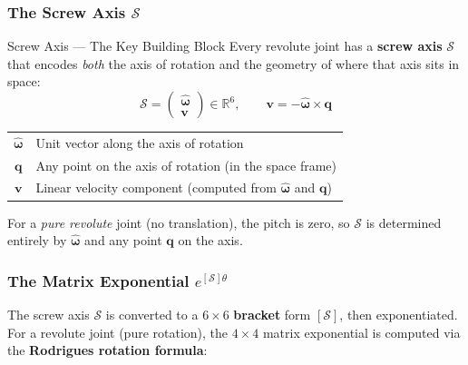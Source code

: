 \documentclass[12pt,a4paper]{article}
\newcommand{\R}{\mathbb{R}}
\newcommand{\vect}[1]{\bm{#1}}
\begin{document}
\subsubsection{The Screw Axis $\mathcal{S}$}

\begin{conceptbox}{Screw Axis --- The Key Building Block}
Every revolute joint has a \textbf{screw axis} $\mathcal{S}$ that
encodes \emph{both} the axis of rotation and the geometry of where that
axis sits in space:
\[
  \mathcal{S} = \begin{pmatrix}\vect{\hat\omega} \\ \vect{v}\end{pmatrix}
  \in \R^6,
  \qquad
  \vect{v} = -\vect{\hat\omega} \times \vect{q}
\]

\begin{tabular}{cl}
  $\vect{\hat\omega}$ & Unit vector along the axis of rotation \\
  $\vect{q}$          & Any point on the axis of rotation (in the space frame) \\
  $\vect{v}$          & Linear velocity component (computed from $\vect{\hat\omega}$ and $\vect{q}$) \\
\end{tabular}

For a \emph{pure revolute} joint (no translation), the pitch is zero, so
$\mathcal{S}$ is determined entirely by $\vect{\hat\omega}$ and any point
$\vect{q}$ on the axis.
\end{conceptbox}

\subsubsection{The Matrix Exponential $e^{[\mathcal{S}]\theta}$}

The screw axis $\mathcal{S}$ is converted to a $6\times6$
\textbf{bracket} form $[\mathcal{S}]$, then exponentiated. For a revolute
joint (pure rotation), the $4\times4$ matrix exponential is computed via the
\textbf{Rodrigues rotation formula}:
\end{document}
